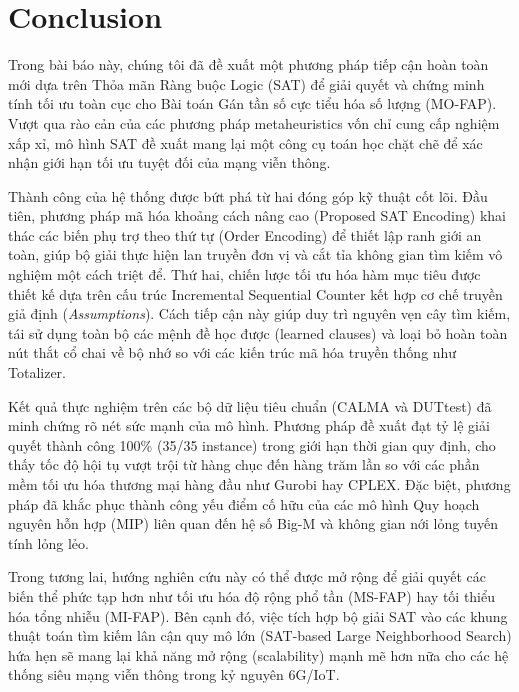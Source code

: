 \documentclass[letterpaper,journal]{IEEEtran}
\begin{document}


\section{Conclusion}
\label{sec:conclusion}

Trong bài báo này, chúng tôi đã đề xuất một phương pháp tiếp cận hoàn toàn mới dựa trên Thỏa mãn Ràng buộc Logic (SAT) để giải quyết và chứng minh tính tối ưu toàn cục cho Bài toán Gán tần số cực tiểu hóa số lượng (MO-FAP). Vượt qua rào cản của các phương pháp metaheuristics vốn chỉ cung cấp nghiệm xấp xỉ, mô hình SAT đề xuất mang lại một công cụ toán học chặt chẽ để xác nhận giới hạn tối ưu tuyệt đối của mạng viễn thông.

Thành công của hệ thống được bứt phá từ hai đóng góp kỹ thuật cốt lõi. Đầu tiên, phương pháp mã hóa khoảng cách nâng cao (Proposed SAT Encoding) khai thác các biến phụ trợ theo thứ tự (Order Encoding) để thiết lập ranh giới an toàn, giúp bộ giải thực hiện lan truyền đơn vị và cắt tỉa không gian tìm kiếm vô nghiệm một cách triệt để. Thứ hai, chiến lược tối ưu hóa hàm mục tiêu được thiết kế dựa trên cấu trúc Incremental Sequential Counter kết hợp cơ chế truyền giả định (\textit{Assumptions}). Cách tiếp cận này giúp duy trì nguyên vẹn cây tìm kiếm, tái sử dụng toàn bộ các mệnh đề học được (learned clauses) và loại bỏ hoàn toàn nút thắt cổ chai về bộ nhớ so với các kiến trúc mã hóa truyền thống như Totalizer.

Kết quả thực nghiệm trên các bộ dữ liệu tiêu chuẩn (CALMA và DUTtest) đã minh chứng rõ nét sức mạnh của mô hình. Phương pháp đề xuất đạt tỷ lệ giải quyết thành công 100\% (35/35 instance) trong giới hạn thời gian quy định, cho thấy tốc độ hội tụ vượt trội từ hàng chục đến hàng trăm lần so với các phần mềm tối ưu hóa thương mại hàng đầu như Gurobi hay CPLEX. Đặc biệt, phương pháp đã khắc phục thành công yếu điểm cố hữu của các mô hình Quy hoạch nguyên hỗn hợp (MIP) liên quan đến hệ số Big-M và không gian nới lỏng tuyến tính lỏng lẻo.

Trong tương lai, hướng nghiên cứu này có thể được mở rộng để giải quyết các biến thể phức tạp hơn như tối ưu hóa độ rộng phổ tần (MS-FAP) hay tối thiểu hóa tổng nhiễu (MI-FAP). Bên cạnh đó, việc tích hợp bộ giải SAT vào các khung thuật toán tìm kiếm lân cận quy mô lớn (SAT-based Large Neighborhood Search) hứa hẹn sẽ mang lại khả năng mở rộng (scalability) mạnh mẽ hơn nữa cho các hệ thống siêu mạng viễn thông trong kỷ nguyên 6G/IoT.



\end{document}
